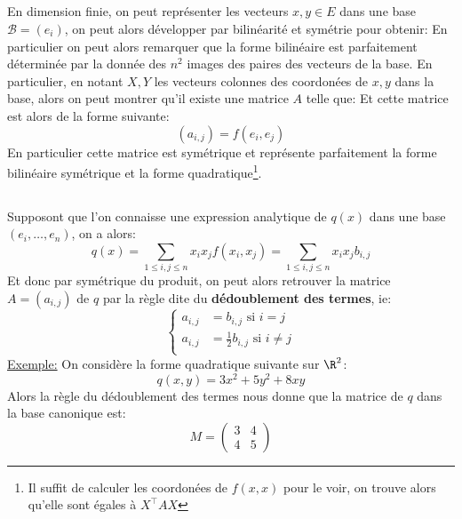 \subsection*{}
En dimension finie, on peut représenter les vecteurs \(x, y \in E\) dans une base \(\mathscr{B} = (e_i)\), on peut alors développer par bilinéarité et symétrie pour obtenir:
En particulier on peut alors remarquer que la forme bilinéaire est parfaitement déterminée par la donnée des \(n^2\) images des paires des vecteurs de la base. En particulier, en notant \(X, Y\) les vecteurs colonnes des coordonées de \(x, y\) dans la base, alors on peut montrer qu'il existe une matrice \(A\) telle que:
Et cette matrice est alors de la forme suivante:
\[
   (a_{i, j}) = f(e_i, e_j)
\]
En particulier cette matrice est symétrique et représente parfaitement la forme bilinéaire symétrique et la forme quadratique\footnote[1]{Il suffit de calculer les coordonées de \(f(x, x)\) pour le voir, on trouve alors qu'elle sont égales à \(X^\top A X\)}.
\subsection*{}
Supposont que l'on connaisse une expression analytique de \(q(x)\) dans une base \((e_i, \ldots, e_n)\), on a alors:
\[
   q(x) = \sum_{1 \leq i, j \leq n} x_ix_j f(x_i, x_j) = \sum_{1 \leq i, j \leq n} x_ix_j b_{i, j}
\]
Et donc par symétrique du produit, on peut alors retrouver la matrice \(A = (a_{i,j})\) de \(q\) par la règle dite du \textbf{dédoublement des termes}, ie:
\[
   \begin{cases}
      a_{i,j} &= b_{i, j} \text{ si } i = j\\
      a_{i,j} &= \frac{1}{2} b_{i, j} \text{ si } i \neq j\\
   \end{cases}   
\]
\uline{Exemple:} On considère la forme quadratique suivante sur \(\R^2\):
\[
   q(x, y) = 3x^2 + 5y^2 + 8xy
\]
Alors la règle du dédoublement des termes nous donne que la matrice de \(q\) dans la base canonique est:
\[
   M = \begin{pmatrix}
      3 & 4 \\
      4 & 5
   \end{pmatrix}   
\]
